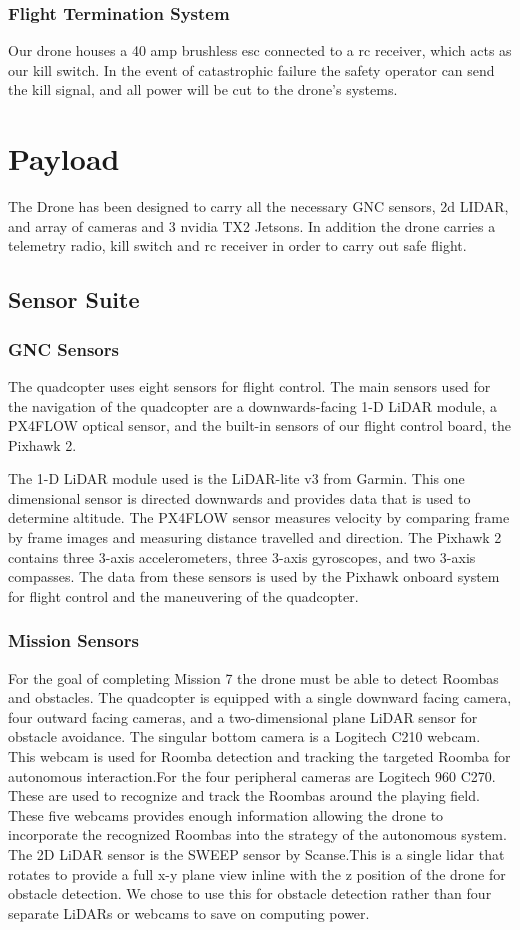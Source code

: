 \documentclass[12pt,letterpaper]{article}
\begin{document}
		\subsubsection*{Flight Termination System}
			Our drone houses a 40 amp brushless esc connected to a rc receiver, which acts as our kill switch. In the event of catastrophic failure the safety operator can send the kill signal, and all power will be cut to the drone's systems.


\section*{Payload}
	The Drone has been designed to carry all the necessary GNC sensors, 2d LIDAR, and array of cameras and 3 nvidia TX2 Jetsons. In addition the drone carries a telemetry radio, kill switch and rc receiver in order to carry out safe flight.
	\subsection*{Sensor Suite}
		\subsubsection*{GNC Sensors}
			The quadcopter uses eight sensors for flight control. The main sensors used for the navigation of the quadcopter are a downwards-facing 1-D LiDAR module, a PX4FLOW optical sensor, and the built-in sensors of our flight control board, the Pixhawk 2.

			The 1-D LiDAR module used is the LiDAR-lite v3 from Garmin. This one dimensional sensor is directed downwards and provides data that is used to determine altitude. The PX4FLOW sensor measures velocity by comparing frame by frame images and measuring distance travelled and direction. The Pixhawk 2 contains three 3-axis accelerometers, three 3-axis gyroscopes, and two 3-axis compasses. The data from these sensors is used by the Pixhawk onboard system for flight control and the maneuvering of the quadcopter.

		\subsubsection*{Mission Sensors}
			For the goal of completing Mission 7 the drone must be able to detect Roombas and obstacles. The quadcopter is equipped with a single downward facing camera, four outward facing cameras, and a two-dimensional plane LiDAR sensor for obstacle avoidance.
			The singular bottom camera is a Logitech C210 webcam. This webcam is used for Roomba detection and tracking the targeted Roomba for autonomous interaction.For the four peripheral cameras are Logitech 960 C270. These are used to recognize and track the Roombas around the playing field. These five webcams provides enough information allowing the drone to incorporate the recognized Roombas into the strategy of the autonomous system.
			The 2D LiDAR sensor is the SWEEP sensor by Scanse.This is a single lidar that rotates to provide a full x-y plane view inline with the z position of the drone for obstacle detection. We chose to use this for obstacle detection rather than four separate LiDARs or webcams to save on computing power.
\end{document}
